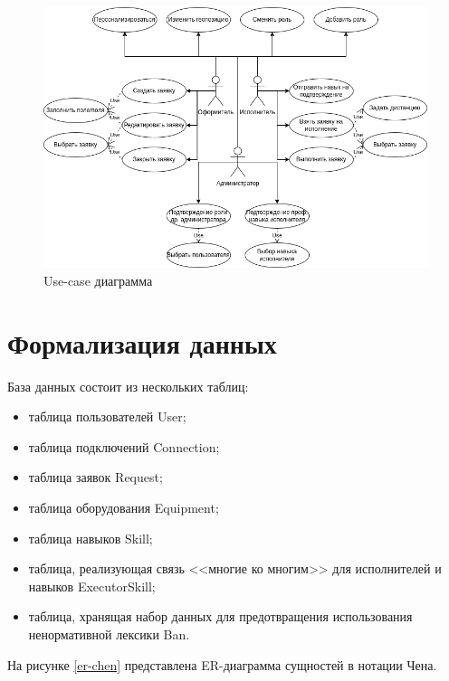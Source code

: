 \begin{figure}[H]
	\begin{center}
		\includegraphics[scale=0.6]{assets/use-case.png}
	\end{center}
	\caption{Use-case диаграмма}
	\label{use-case}
\end{figure}

\section{Формализация данных}

База данных состоит из нескольких таблиц:
\begin{itemize}
	\item таблица пользователей User;
	\item таблица подключений Connection;
	\item таблица заявок Request;
	\item таблица оборудования Equipment;
	\item таблица навыков Skill;
	\item таблица, реализующая связь <<многие ко многим>> для исполнителей и навыков ExecutorSkill;
	\item таблица, хранящая набор данных для предотвращения использования ненормативной лексики Ban.
\end{itemize}
На рисунке \ref{er-chen} представлена ER-диаграмма сущностей в нотации Чена.

